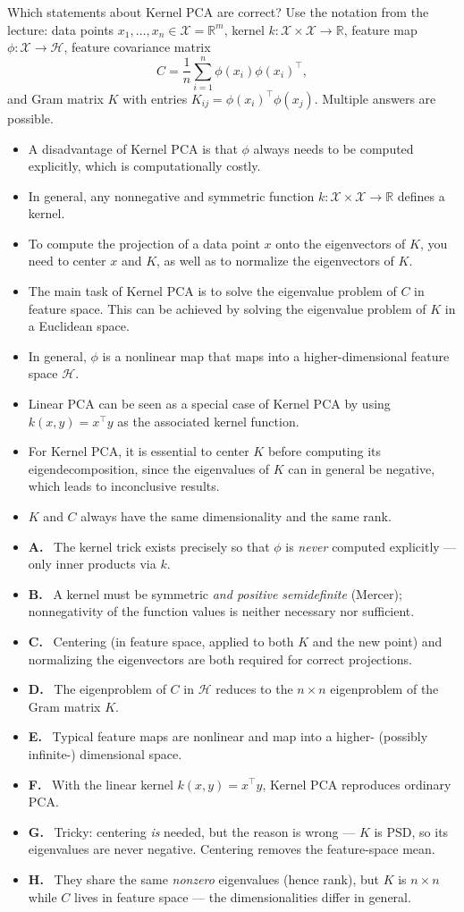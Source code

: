 \documentclass[11pt,oneside]{article}
\newcounter{question}
\newcommand{\questiontitle}[1]{%
  \stepcounter{question}\begin{qbox}[Question \thequestion: #1]}
\newcommand{\closequestion}{\end{qbox}}
\newcommand{\choice}{\item[$\square$] }
\newenvironment{answer}[1]{%
  \begin{keybox}[Answer]%
  \begin{itemize}[leftmargin=1.7em,itemsep=1.5pt,topsep=2pt]}%
  {\end{itemize}\end{keybox}}
\newcommand{\yes}[1]{\item[\textcolor{ok}{\ensuremath{\checkmark}}]\textbf{#1.}\ }
\newcommand{\no}[1]{\item[\textcolor{bad}{\ensuremath{\bm\times}}]\textbf{#1.}\ }
\newcommand{\R}{\mathbb{R}}
\begin{document}
\questiontitle{Kernel PCA}
Which statements about Kernel PCA are correct?
Use the notation from the lecture: data points $x_1,\dots,x_n\in\mathcal X=\R^m$, kernel $k:\mathcal X\times\mathcal X\to\R$, feature map $\phi:\mathcal X\to\mathcal H$, feature covariance matrix
\[
C=\frac1n\sum_{i=1}^n\phi(x_i)\phi(x_i)^\top,
\]
and Gram matrix $K$ with entries $K_{ij}=\phi(x_i)^\top\phi(x_j)$.
Multiple answers are possible.
\begin{itemize}
  \choice A disadvantage of Kernel PCA is that $\phi$ always needs to be computed explicitly, which is computationally costly.
  \choice In general, any nonnegative and symmetric function $k:\mathcal X\times\mathcal X\to\R$ defines a kernel.
  \choice To compute the projection of a data point $x$ onto the eigenvectors of $K$, you need to center $x$ and $K$, as well as to normalize the eigenvectors of $K$.
  \choice The main task of Kernel PCA is to solve the eigenvalue problem of $C$ in feature space. This can be achieved by solving the eigenvalue problem of $K$ in a Euclidean space.
  \choice In general, $\phi$ is a nonlinear map that maps into a higher-dimensional feature space $\mathcal H$.
  \choice Linear PCA can be seen as a special case of Kernel PCA by using $k(x,y)=x^\top y$ as the associated kernel function.
  \choice For Kernel PCA, it is essential to center $K$ before computing its eigendecomposition, since the eigenvalues of $K$ can in general be negative, which leads to inconclusive results.
  \choice $K$ and $C$ always have the same dimensionality and the same rank.
\end{itemize}
\closequestion
\begin{answer}{C, D, E, F}
  \no{A} The kernel trick exists precisely so that $\phi$ is \emph{never} computed explicitly --- only inner products via $k$.
  \no{B} A kernel must be symmetric \emph{and positive semidefinite} (Mercer); nonnegativity of the function values is neither necessary nor sufficient.
  \yes{C} Centering (in feature space, applied to both $K$ and the new point) and normalizing the eigenvectors are both required for correct projections.
  \yes{D} The eigenproblem of $C$ in $\mathcal H$ reduces to the $n\times n$ eigenproblem of the Gram matrix $K$.
  \yes{E} Typical feature maps are nonlinear and map into a higher- (possibly infinite-) dimensional space.
  \yes{F} With the linear kernel $k(x,y)=x^\top y$, Kernel PCA reproduces ordinary PCA.
  \no{G} Tricky: centering \emph{is} needed, but the reason is wrong --- $K$ is PSD, so its eigenvalues are never negative. Centering removes the feature-space mean.
  \no{H} They share the same \emph{nonzero} eigenvalues (hence rank), but $K$ is $n\times n$ while $C$ lives in feature space --- the dimensionalities differ in general.
\end{answer}
\end{document}
